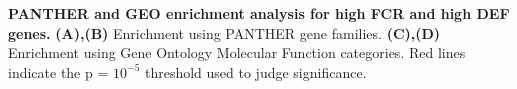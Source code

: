 \textbf{PANTHER and GEO enrichment analysis for high FCR and high DEF genes.}
\textbf{(A),(B)} Enrichment using PANTHER gene families. \textbf{(C),(D)} Enrichment using Gene Ontology Molecular Function categories. Red lines indicate the p = $10^{-5}$ threshold used to judge significance.